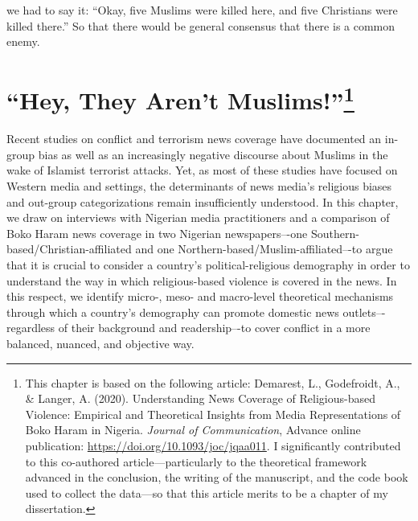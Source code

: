 \begin{savequote}[9cm]
[...] we had to say it: “Okay, five Muslims were killed here, and five Christians were killed there.” So that there would be general consensus that there is a common enemy. 
\end{savequote}


\chapter[``Hey, They Aren't Muslims!'']{``Hey, They Aren't Muslims!''\footnote{This chapter is based on the following article: Demarest, L., Godefroidt, A., \& Langer, A. (2020). Understanding News Coverage of Religious-based Violence: Empirical and Theoretical Insights from Media Representations of Boko Haram in Nigeria. \textit{Journal of Communication}, Advance online publication: \href{https://academic.oup.com/joc/advance-article/doi/10.1093/joc/jqaa011/5841553}{https://doi.org/10.1093/joc/jqaa011}. I significantly contributed to this co-authored article---particularly to the theoretical framework advanced in the conclusion, the writing of the manuscript, and the code book used to collect the data---so that this article merits to be a chapter of my dissertation.}}
\label{chap:chap4}


\begin{chapabstract}
Recent studies on conflict and terrorism news coverage have documented an in-group bias as well as an increasingly negative discourse about Muslims in the wake of Islamist terrorist attacks. Yet, as most of these studies have focused on Western media and settings, the determinants of news media’s religious biases and out-group categorizations remain insufficiently understood. In this chapter, we draw on interviews with Nigerian media practitioners and a comparison of Boko Haram news coverage in two Nigerian newspapers–-one Southern-based/Christian-affiliated and one Northern-based/Muslim-affiliated–-to argue that it is crucial to consider a country’s political-religious demography in order to understand the way in which religious-based violence is covered in the news. In this respect, we identify micro-, meso- and macro-level theoretical mechanisms through which a country’s demography can promote domestic news outlets–-regardless of their background and readership–-to cover conflict in a more balanced, nuanced, and objective way.
\end{chapabstract}
    

